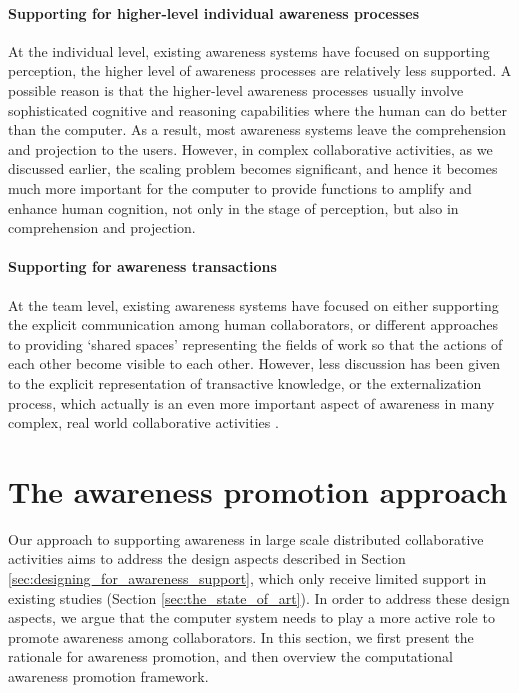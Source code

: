 \paragraph*{Supporting for higher-level individual awareness processes} %
\label{par:supporting_for_higher_level_individual_awareness_processes}
At the individual level, existing awareness systems have focused on supporting perception, the higher level of awareness processes are relatively less supported. A possible reason is that the higher-level awareness processes usually involve sophisticated cognitive and reasoning capabilities where the human can do better than the computer. As a result, most awareness systems leave the comprehension and projection to the users. However, in complex collaborative activities, as we discussed earlier, the scaling problem becomes significant, and hence it becomes much more important for the computer to provide functions to amplify and enhance human cognition, not only in the stage of perception, but also in comprehension and projection.

\paragraph*{Supporting for awareness transactions} %
\label{par:supporting_for_awareness_transactions}
At the team level, existing awareness systems have focused on either supporting the explicit communication among human collaborators, or different approaches to providing `shared spaces' representing the fields of work so that the actions of each other become visible to each other. However, less discussion has been given to the explicit representation of transactive knowledge, or the externalization process, which actually is an even more important aspect of awareness in many complex, real world collaborative activities \cite{heath2002a}.

\section{The awareness promotion approach} %
\label{sec:awareness_promotion_approach}
Our approach to supporting awareness in large scale distributed collaborative activities aims to address the design aspects described in Section \ref{sec:designing_for_awareness_support}, which only receive limited support in existing studies (Section \ref{sec:the_state_of_art}). In order to address these design aspects, we argue that the computer system needs to play a more active role to promote awareness among collaborators. In this section, we first present the rationale for awareness promotion, and then overview the computational awareness promotion framework.

